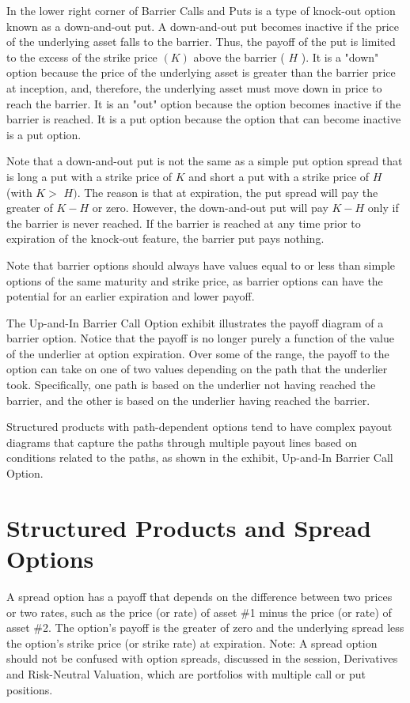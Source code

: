 \documentclass[11pt]{article}
\begin{document}
In the lower right corner of Barrier Calls and Puts is a type of knock-out option known as a down-and-out put. A down-and-out put becomes inactive if the price of the underlying asset falls to the barrier. Thus, the payoff of the put is limited to the excess of the strike price $(K)$ above the barrier ( $H$ ). It is a "down" option because the price of the underlying asset is greater than the barrier price at inception, and, therefore, the underlying asset must move down in price to reach the barrier. It is an "out" option because the option becomes inactive if the barrier is reached. It is a put option because the option that can become inactive is a put option.

Note that a down-and-out put is not the same as a simple put option spread that is long a put with a strike price of $K$ and short a put with a strike price of $H$ (with $K>$ $H)$. The reason is that at expiration, the put spread will pay the greater of $K-H$ or zero. However, the down-and-out put will pay $K-H$ only if the barrier is never reached. If the barrier is reached at any time prior to expiration of the knock-out feature, the barrier put pays nothing.

Note that barrier options should always have values equal to or less than simple options of the same maturity and strike price, as barrier options can have the potential for an earlier expiration and lower payoff.

The Up-and-In Barrier Call Option exhibit illustrates the payoff diagram of a barrier option. Notice that the payoff is no longer purely a function of the value of the underlier at option expiration. Over some of the range, the payoff to the option can take on one of two values depending on the path that the underlier took. Specifically, one path is based on the underlier not having reached the barrier, and the other is based on the underlier having reached the barrier.

Structured products with path-dependent options tend to have complex payout diagrams that capture the paths through multiple payout lines based on conditions related to the paths, as shown in the exhibit, Up-and-In Barrier Call Option.

\section*{Structured Products and Spread Options}
A spread option has a payoff that depends on the difference between two prices or two rates, such as the price (or rate) of asset \#1 minus the price (or rate) of asset \#2. The option's payoff is the greater of zero and the underlying spread less the option's strike price (or strike rate) at expiration. Note: A spread option should not be confused with option spreads, discussed in the session, Derivatives and Risk-Neutral Valuation, which are portfolios with multiple call or put positions.
\end{document}
